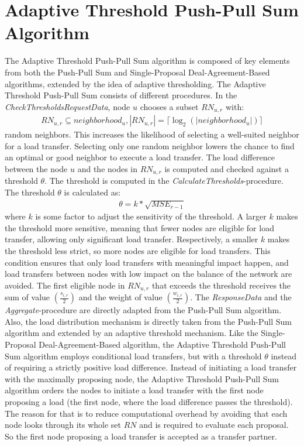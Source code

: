 \section{Adaptive Threshold Push-Pull Sum Algorithm}\label{sec:adaptivethresholdPPS}
The Adaptive Threshold Push-Pull Sum algorithm is composed of key elements from both the Push-Pull Sum and Single-Proposal Deal-Agreement-Based algorithms, extended by the idea of adaptive thresholding. The Adaptive Threshold Push-Pull Sum consists of different procedures. In the \textit{CheckThresholdsRequestData}, node $u$ chooses a subset $RN_{u,r}$ with:
\begin{align}
    RN_{u,r} \subseteq neighborhood_{u}, |RN_{u,r}|=\lceil \log_{2}{(|neighborhood_{u}|)} \rceil
\end{align}
random neighbors. This increases the likelihood of selecting a well-suited neighbor for a load transfer. Selecting only one random neighbor lowers the chance to find an optimal or good neighbor to execute a load transfer. The load difference between the node $u$ and the nodes in $RN_{u,r}$ is computed and checked against a threshold $\theta$. The threshold is computed in the \textit{CalculateThresholds}-procedure. The threshold $\theta$ is calculated as:
\begin{align}
    \theta = k*\sqrt{MSE_{r-1}}    
\end{align}
where $k$ is some factor to adjust the sensitivity of the threshold. A larger $k$ makes the threshold more sensitive, meaning that fewer nodes are eligible for load transfer, allowing only significant load transfer. Respectively, a smaller $k$ makes the threshold less strict, so more nodes are eligible for load transfers. This condition ensures that only load transfers with meaningful impact happen, and load transfers between nodes with low impact on the balance of the network are avoided. The first eligible node in $RN_{u,r}$ that exceeds the threshold receives the sum of value $(\frac{s_{i,r}}{2})$ and the weight of value $(\frac{w_{i,r}}{2})$. The \textit{ResponseData} and the \textit{Aggregate}-procedure are directly adapted from the Push-Pull Sum algorithm. Also, the load distribution mechanism is directly taken from the Push-Pull Sum algorithm and extended by an adaptive threshold mechanism. Like the Single-Proposal Deal-Agreement-Based algorithm, the Adaptive Threshold Push-Pull Sum algorithm employs conditional load transfers, but with a threshold $\theta$ instead of requiring a strictly positive load difference. Instead of initiating a load transfer with the maximally proposing node, the Adaptive Threshold Push-Pull Sum algorithm orders the nodes to initiate a load transfer with the first node proposing a load (the first node, where the load difference passes the threshold). The reason for that is to reduce computational overhead by avoiding that each node looks through its whole set $RN$ and is required to evaluate each proposal. So the first node proposing a load transfer is accepted as a transfer partner.

